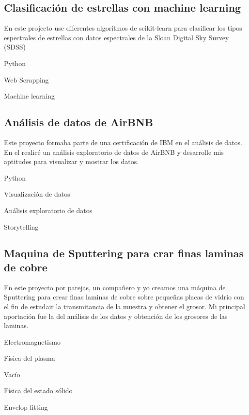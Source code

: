 \subsection{{Clasificación de estrellas con machine learning \hfill }}
\vspace{.5em} En este projecto use diferentes algoritmos de scikit-learn para clasificar los tipos espectrales de estrellas con datos espectrales de la Sloan Digital Sky Survey (SDSS) 
\begin{zitemize}
\item Python
\item Web Scrapping
\item Machine learning
\end{zitemize}

\subsection{{Análisis de datos de AirBNB \hfill}}
\vspace{.5em} Este proyecto formaba parte de una certificación de IBM en el análisis de datos. En el realicé un análisis exploratorio de datos de AirBNB y desarrolle mis aptitudes para visualizar y mostrar los datos.
\begin{zitemize}
\item Python
\item Visualización de datos
\item Análisis exploratorio de datos
\item Storytelling
\end{zitemize}

\subsection{{Maquina de Sputtering para crar finas laminas de cobre}}
\vspace{.5em} En este proyecto por parejas, un compañero y yo creamos una máquina de Sputtering para crear finas laminas de cobre sobre pequeñas placas de vidrio con el fin de estudair la transmitancia de la muestra y obtener el grosor. Mi principal aportación fue la del análisis de los datos y obtención de los grosores de las laminas.
\begin{zitemize}
\item Electromagnetismo
\item Física del plasma
\item Vacío
\item Física del estado sólido
\item Envelop fitting
\end{zitemize}


